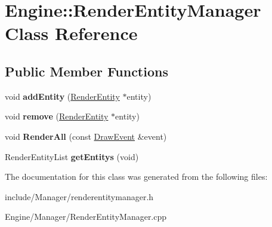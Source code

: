 \hypertarget{classEngine_1_1RenderEntityManager}{}\section{Engine\+:\+:Render\+Entity\+Manager Class Reference}
\label{classEngine_1_1RenderEntityManager}
\subsection*{Public Member Functions}
\begin{DoxyCompactItemize}
\item 
\hypertarget{classEngine_1_1RenderEntityManager_aa31d822f8ddcc202d61af4433fc3ce84}{}void {\bfseries add\+Entity} (\hyperlink{classEngine_1_1RenderEntity}{Render\+Entity} $\ast$entity)\label{classEngine_1_1RenderEntityManager_aa31d822f8ddcc202d61af4433fc3ce84}

\item 
\hypertarget{classEngine_1_1RenderEntityManager_a2af97d37c0f503cbd99dbaa291364dc5}{}void {\bfseries remove} (\hyperlink{classEngine_1_1RenderEntity}{Render\+Entity} $\ast$entity)\label{classEngine_1_1RenderEntityManager_a2af97d37c0f503cbd99dbaa291364dc5}

\item 
\hypertarget{classEngine_1_1RenderEntityManager_afc0a2f61569fe06ba7c8176149c822b7}{}void {\bfseries Render\+All} (const \hyperlink{classEngine_1_1DrawEvent}{Draw\+Event} \&event)\label{classEngine_1_1RenderEntityManager_afc0a2f61569fe06ba7c8176149c822b7}

\item 
\hypertarget{classEngine_1_1RenderEntityManager_a2b11706d6b3932d1d1fdb0dc6415604a}{}Render\+Entity\+List {\bfseries get\+Entitys} (void)\label{classEngine_1_1RenderEntityManager_a2b11706d6b3932d1d1fdb0dc6415604a}

\end{DoxyCompactItemize}


The documentation for this class was generated from the following files\+:\begin{DoxyCompactItemize}
\item 
include/\+Manager/renderentitymanager.\+h\item 
Engine/\+Manager/Render\+Entity\+Manager.\+cpp\end{DoxyCompactItemize}
